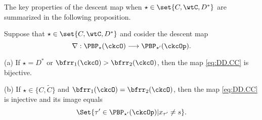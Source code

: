 \documentclass[ssunip]{subfiles}
\begin{document}


The key properties of the descent map when $\star\in \set{C,\wtC,D^*}$ are summarized in the following proposition.   

\begin{prop}\label{lem:DD.bij}
Suppose that $\star \in \set{C,\wtC,D^*}$ and cosider the
descent map
\begin{equation}\label{eq:DD.CC}
\nabla: \PBP_\star(\ckcO)\longrightarrow  \PBP_{\star'}(\ckcOp). 
\end{equation} 

\noindent (a) If 
$\star=D^*$ or $\bfrr_1(\ckcO)>\bfrr_2(\ckcO)$, then 
the map \eqref{eq:DD.CC}  is bijective.
 
 \noindent (b) If  $\star\in \{C,\widetilde C\}$ and $\bfrr_1(\ckcO)=\bfrr_2(\ckcO)$, then the  map \eqref{eq:DD.CC} is injective and its image equals 
\[
\Set{\tau'\in \PBP_{\star'}(\ckcOp)| x_{\tau'}\neq s}.
\]

\end{prop}
\end{document}
